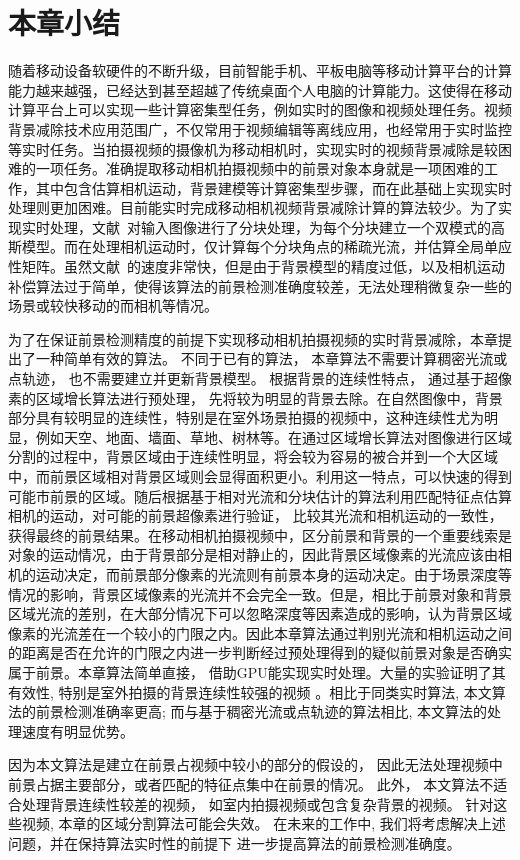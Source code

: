 \section{本章小结}
\label{ch5:sec:conclusions}
随着移动设备软硬件的不断升级，目前智能手机、平板电脑等移动计算平台的计算能力越来越强，已经达到甚至超越了传统桌面个人电脑的计算能力。这使得在移动计算平台上可以实现一些计算密集型任务，例如实时的图像和视频处理任务。视频背景减除技术应用范围广，不仅常用于视频编辑等离线应用，也经常用于实时监控等实时任务。当拍摄视频的摄像机为移动相机时，实现实时的视频背景减除是较困难的一项任务。准确提取移动相机拍摄视频中的前景对象本身就是一项困难的工作，其中包含估算相机运动，背景建模等计算密集型步骤，而在此基础上实现实时处理则更加困难。目前能实时完成移动相机视频背景减除计算的算法较少。为了实现实时处理，文献~对输入图像进行了分块处理，为每个分块建立一个双模式的高斯模型。而在处理相机运动时，仅计算每个分块角点的稀疏光流，并估算全局单应性矩阵。虽然文献~的速度非常快，但是由于背景模型的精度过低，以及相机运动补偿算法过于简单，使得该算法的前景检测准确度较差，无法处理稍微复杂一些的场景或较快移动的而相机等情况。\par
为了在保证前景检测精度的前提下实现移动相机拍摄视频的实时背景减除，本章提出了一种简单有效的算法。 不同于已有的算法， 本章算法不需要计算稠密光流或点轨迹， 也不需要建立并更新背景模型。 根据背景的连续性特点， 通过基于超像素的区域增长算法进行预处理， 先将较为明显的背景去除。在自然图像中，背景部分具有较明显的连续性，特别是在室外场景拍摄的视频中，这种连续性尤为明显，例如天空、地面、墙面、草地、树林等。在通过区域增长算法对图像进行区域分割的过程中，背景区域由于连续性明显，将会较为容易的被合并到一个大区域中，而前景区域相对背景区域则会显得面积更小。利用这一特点，可以快速的得到可能市前景的区域。随后根据基于相对光流和分块估计的算法利用匹配特征点估算相机的运动，对可能的前景超像素进行验证， 比较其光流和相机运动的一致性，获得最终的前景结果。在移动相机拍摄视频中，区分前景和背景的一个重要线索是对象的运动情况，由于背景部分是相对静止的，因此背景区域像素的光流应该由相机的运动决定，而前景部分像素的光流则有前景本身的运动决定。由于场景深度等情况的影响，背景区域像素的光流并不会完全一致。但是，相比于前景对象和背景区域光流的差别，在大部分情况下可以忽略深度等因素造成的影响，认为背景区域像素的光流差在一个较小的门限之内。因此本章算法通过判别光流和相机运动之间的距离是否在允许的门限之内进一步判断经过预处理得到的疑似前景对象是否确实属于前景。本章算法简单直接， 借助GPU能实现实时处理。大量的实验证明了其有效性, 特别是室外拍摄的背景连续性较强的视频 。相比于同类实时算法, 本文算法的前景检测准确率更高; 而与基于稠密光流或点轨迹的算法相比, 本文算法的处理速度有明显优势。\par
因为本文算法是建立在前景占视频中较小的部分的假设的， 因此无法处理视频中前景占据主要部分，或者匹配的特征点集中在前景的情况。 此外， 本文算法不适合处理背景连续性较差的视频， 如室内拍摄视频或包含复杂背景的视频。 针对这些视频, 本章的区域分割算法可能会失效。 在未来的工作中, 我们将考虑解决上述问题，并在保持算法实时性的前提下 进一步提高算法的前景检测准确度。

